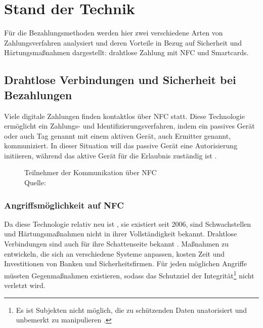 \section{Stand der Technik}

Für die Bezahlungsmethoden werden hier zwei verschiedene Arten von Zahlungsverfahren analysiert und deren
Vorteile in Bezug auf Sicherheit und Härtungsmaßnahmen dargestellt: drahtlose Zahlung mit NFC und 
Smartcards.

\subsection{Drahtlose Verbindungen und Sicherheit bei Bezahlungen}

Viele digitale Zahlungen finden kontaktlos über NFC statt. Diese Technologie ermöglicht ein Zahlungs- und
Identifizierungsverfahren, indem ein passives Gerät oder auch Tag genannt mit einem aktiven Gerät,
auch Ermitter genannt, kommuniziert. In dieser Situation will das passive Gerät eine Autorisierung initiieren,
während das aktive Gerät für die Erlaubnis zuständig ist \cite{refart:NFNK}. 

\begin{figure}[H]
   \caption{Teilnehmer der Kommunikation über NFC\\Quelle: \cite{refart:GPIN}}
   \label{fig:refart_GPIN}
\end{figure}

\subsubsection{Angriffsmöglichkeit auf NFC}

Da diese Technologie relativ neu ist \cite{refip:NTAS}, sie existiert seit 2006, sind Schwachstellen 
und Härtungsmaßnahmen nicht in ihrer Vollständigkeit bekannt. Drahtlose Verbindungen sind auch für ihre 
Schattenseite bekannt \cite{refip:NYRS}. Maßnahmen zu entwickeln, die sich an verschiedene Systeme anpassen,
kosten Zeit und Investitionen von Banken und Sicherheitsfirmen. Für jeden möglichen Angriffe müssten 
Gegenmaßnahmen existieren, sodass das Schutzziel der Integrität\footnote{Es ist Subjekten nicht möglich, 
die zu schützenden Daten unatorisiert und unbemerkt zu manipulieren \cite{refbook:SWIS}.} nicht verletzt wird.

